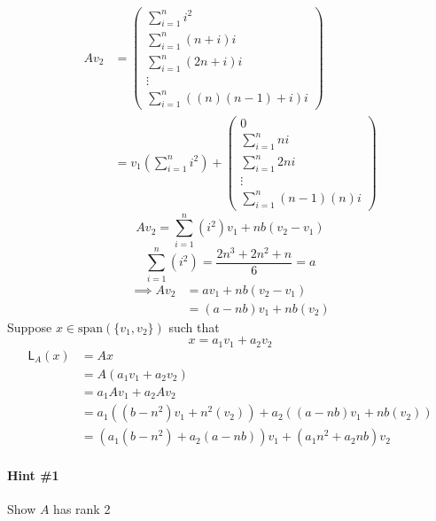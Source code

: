 \begin{align}
Av_2 &=
\begin{pmatrix}
 \sum\limits_{i=1}^n i^2\\
 \sum\limits_{i=1}^n (n+i)i\\
 \sum\limits_{i=1}^n (2n+i)i\\
 \vdots\\
 \sum\limits_{i=1}^n \left((n)(n-1)+i\right)i
\end{pmatrix}\\
&=v_1\left(\sum\limits_{i=1}^n i^2\right) + \begin{pmatrix}
0\\
 \sum\limits_{i=1}^n ni\\
 \sum\limits_{i=1}^n 2ni\\
\vdots\\
 \sum\limits_{i=1}^n(n-1)(n)i
\end{pmatrix}
\end{align}
\begin{equation}
Av_2 =  \sum\limits_{i=1}^n(i^2)v_1 + nb(v_2-v_1)
\end{equation}
\begin{equation}
\sum\limits_{i=1}^n(i^2) = \frac{2n^3 + 2n^2 +n}{6} = a
\end{equation}
\begin{align}
\implies Av_2 &= av_1 + nb(v_2-v_1)\\
&= (a-nb)v_1 + nb(v_2)
\end{align}
Suppose $x \in \text{span}{(\{v_1,v_2\})}$ such that
\begin{equation}
x = a_1v_1 + a_2v_2
\end{equation}
\begin{align}
\mathsf{L}_A(x) &= Ax \\
&= A(a_1v_1 + a_2v_2)\\
&= a_1Av_1 + a_2Av_2\\
&= a_1((b-n^2)v_1 + n^2(v_2))+ a_2((a-nb)v_1 + nb(v_2))\\
&= (a_1(b-n^2) +a_2(a-nb))v_1 + (a_1n^2 + a_2nb)v_2
\end{align}

\paragraph{Hint \#1} Show $A$ has rank 2

